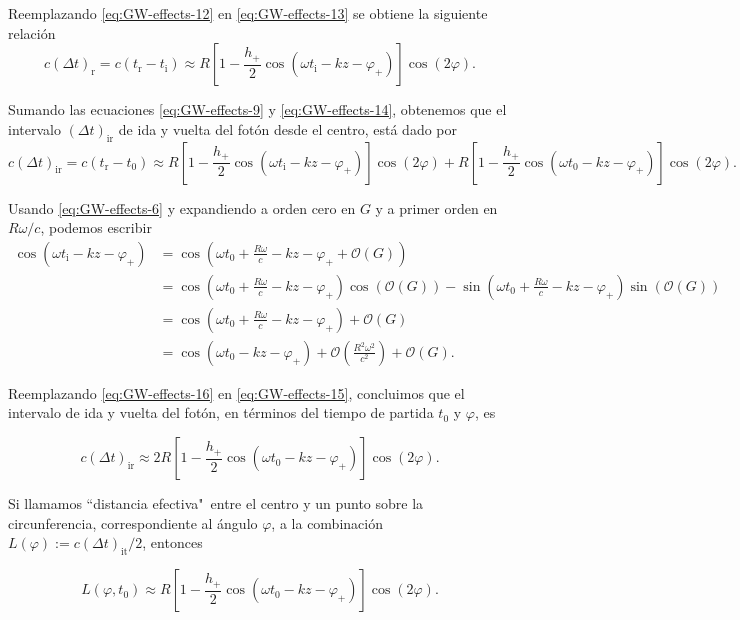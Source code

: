 \documentclass[letterpaper,11pt]{article}
\begin{document}
Reemplazando \eqref{eq:GW-effects-12} en \eqref{eq:GW-effects-13} se obtiene la siguiente relación
\begin{equation}
c(\Delta t)_{\text{r}} = c(t_{\text{r}} - t_{\text{i}}) \approx R \left[ 1 - \frac{h_{+}}{2} \cos(\omega t_{\text{i}} - kz - \varphi_{+} )\right] \cos(2\varphi) . \label{eq:GW-effects-14}
\end{equation}

Sumando las ecuaciones \eqref{eq:GW-effects-9} y \eqref{eq:GW-effects-14}, obtenemos que el intervalo $(\Delta t)_{\text{ir}}$ de ida y vuelta del fotón desde el centro, está dado por
\begin{equation}
c(\Delta t)_{\text{ir}} = c(t_{\text{r}} - t_{0}) \approx R \left[ 1 - \frac{h_{+}}{2} \cos(\omega t_{\text{i}} - kz - \varphi_{+} )\right]\cos(2\varphi) + R \left[ 1 - \frac{h_{+}}{2} \cos(\omega t_{0} - kz - \varphi_{+} )\right]\cos(2\varphi). \label{eq:GW-effects-15}
\end{equation}

Usando \eqref{eq:GW-effects-6} y expandiendo a orden cero en $G$ y a primer orden en $R\omega/c$, podemos escribir 
\begin{align}
\cos(\omega t_{\text{i}} - kz - \varphi_{+} ) &= \cos\left(\omega t_0 + \frac{R\omega}{c} - kz - \varphi_{+} + \mathcal{O}(G)\right) \nonumber \\
&=  \cos\left(\omega t_0 + \frac{R\omega}{c} - kz - \varphi_{+}\right) \cos(\mathcal{O}(G)) - \sin\left(\omega t_0 + \frac{R\omega}{c} - kz - \varphi_{+}\right) \sin(\mathcal{O}(G)) \nonumber \\
&= \cos\left(\omega t_0 + \frac{R\omega}{c} - kz - \varphi_{+}\right) + \mathcal{O}(G) \nonumber \\ 
&= \cos\left(\omega t_0 - kz - \varphi_{+}\right) + \mathcal{O}\left( \frac{R^2\omega^2}{c^2}  \right) + \mathcal{O}(G).\label{eq:GW-effects-16}
\end{align}

Reemplazando \eqref{eq:GW-effects-16} en \eqref{eq:GW-effects-15}, concluimos que el intervalo de ida y vuelta del fotón, en términos del tiempo de partida $t_0$ y $\varphi$, es
\begin{shaded}
\begin{equation}
c(\Delta t)_{\text{ir}} \approx 2 R \left[ 1 - \frac{h_{+}}{2} \cos(\omega t_{0} - kz - \varphi_{+} )\right]\cos(2\varphi).
\end{equation}
\end{shaded}

Si llamamos ``distancia efectiva"\ entre el centro y un punto sobre la circunferencia, correspondiente al ángulo $\varphi$, a la combinación $L(\varphi):= c (\Delta t)_{\text{it}}/2$, entonces
\begin{shaded}
\begin{equation}
L(\varphi,t_0) \approx R \left[ 1 - \frac{h_{+}}{2} \cos(\omega t_{0} - kz - \varphi_{+} )\right]\cos(2\varphi).
\end{equation}
\end{shaded}
\end{document}
